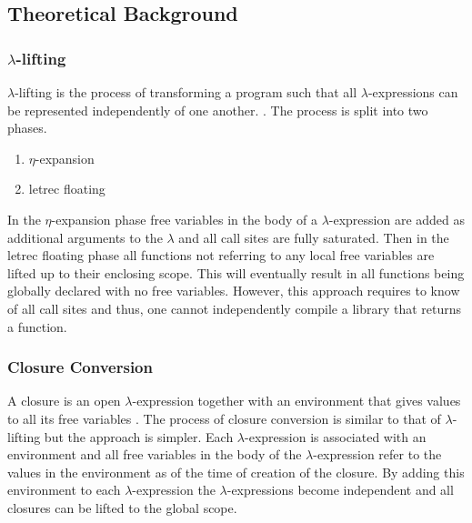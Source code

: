 
\subsection{Theoretical Background}

\subsubsection{$\lambda$-lifting}
$\lambda$-lifting is the process of transforming a program such that all $\lambda$-expressions can be represented independently of one another. \cite{Johnsson1985,lambdalift}. The process is split into two phases.
\begin{enumerate}
\item $\eta$-expansion
\item letrec floating
\end{enumerate}
In the $\eta$-expansion phase free variables in the body of a $\lambda$-expression are added as additional arguments to the $\lambda$ and all call sites are fully saturated. Then in the letrec floating phase all functions not referring to any local free variables are lifted up to their enclosing scope. \cite{Johnsson1985} This will eventually result in all functions being globally declared with no free variables. However, this approach requires to know of all call sites and thus, one cannot independently compile a library that returns a function. 

\subsubsection{Closure Conversion}

A closure is an open $\lambda$-expression together with an environment that gives values to all its free variables \cite{sussman1998scheme}. The process of closure conversion is similar to that of $\lambda$-lifting but the approach is simpler. Each $\lambda$-expression is associated with an environment and all free variables in the body of the $\lambda$-expression refer to the values in the environment as of the time of creation of the closure. By adding this environment to each $\lambda$-expression the $\lambda$-expressions become independent and all closures can be lifted to the global scope.

